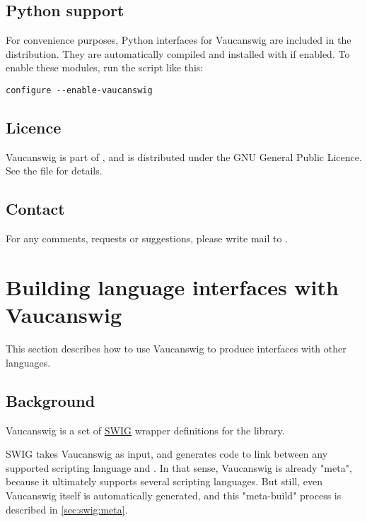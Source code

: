 \subsection{Python support}

For convenience purposes, Python interfaces for Vaucanswig are
included in the distribution.  They are automatically compiled and
installed with \Vauc if enabled.  To enable these modules, run the
 script like this:

\begin{lstlisting}
configure --enable-vaucanswig
\end{lstlisting}

\subsection{Licence}

Vaucanswig  is part  of \Vauc,  and is  distributed under  the GNU
General Public Licence. See the file  for details.

\subsection{Contact}

For  any  comments, requests  or  suggestions,  please  write mail  to
.


\section{Building language interfaces with Vaucanswig}
\label{sec:swig:build}

This section describes how to use Vaucanswig to produce interfaces
with other languages.

\subsection{Background}

Vaucanswig is a set of \href{http://www.swig.org}{SWIG} wrapper
definitions for the \Vauc library.

SWIG takes Vaucanswig as input, and generates code to link between any
supported scripting language and \Cxx. In that sense, Vaucanswig is
already "meta", because it ultimately supports several scripting
languages. But still, even Vaucanswig itself is automatically
generated, and this "meta-build" process is described in
\autoref{sec:swig:meta}.

